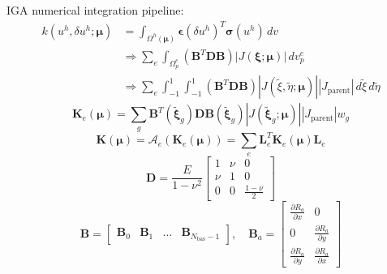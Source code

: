 \documentclass[12pt,a4paper,oneside]{report}
\newcommand{\vect}[1]{\mathbf{#1}}
\newcommand{\mat}[1]{\mathbf{#1}}
\begin{document}
IGA numerical integration pipeline:
\begin{align}
    k(u^h, \delta u^h; \boldsymbol{\mu}) & = \int_{\Omega^h(\boldsymbol{\mu})} \vect{\epsilon}(\delta u^h)^T \vect{\sigma}(u^h) \, dv \\
    & \Rightarrow \sum_e \int_{\Omega_p^e} \left( \mat{B}^T \mat{D} \mat{B} \right) |J(\boldsymbol{\xi}; \boldsymbol{\mu})| \, dv_p^e \\
    & \Rightarrow \sum_e \int_{-1}^{1} \int_{-1}^{1} \left( \mat{B}^T \mat{D} \mat{B} \right) |J(\tilde{\xi}, \tilde{\eta}; \boldsymbol{\mu})| |J_{\text{parent}}| \, d\tilde{\xi} \, d\tilde{\eta}
\end{align}
\begin{equation}
    \mat{K}_e(\boldsymbol{\mu}) = \sum_{g} \mat{B}^T(\tilde{\boldsymbol{\xi}}_g) \mat{D} \mat{B}(\tilde{\boldsymbol{\xi}}_g) |J(\tilde{\boldsymbol{\xi}}_g; \boldsymbol{\mu})| |J_{\text{parent}}| w_g
\end{equation}
\begin{equation}
    \mat{K}(\boldsymbol{\mu}) = \mathcal{A}_e \left( \mat{K}_e(\boldsymbol{\mu}) \right) = \sum_e \mat{L}_e^T \mat{K}_e(\boldsymbol{\mu}) \mat{L}_e
\end{equation}
\begin{equation}
    \mat{D} = \frac{E}{1 - \nu^2} \begin{bmatrix} 1 & \nu & 0 \\ \nu & 1 & 0 \\ 0 & 0 & \frac{1 - \nu}{2} \end{bmatrix}
\end{equation}
\begin{equation}
    \mat{B} = \begin{bmatrix} \mat{B}_0 & \mat{B}_1 & \dots & \mat{B}_{N_{\text{bas}}-1} \end{bmatrix}, \quad \mat{B}_a = \begin{bmatrix} \frac{\partial R_a}{\partial x} & 0 \\[0.3em] 0 & \frac{\partial R_a}{\partial y} \\[0.3em] \frac{\partial R_a}{\partial y} & \frac{\partial R_a}{\partial x} \end{bmatrix}
\end{equation}
\end{document}
